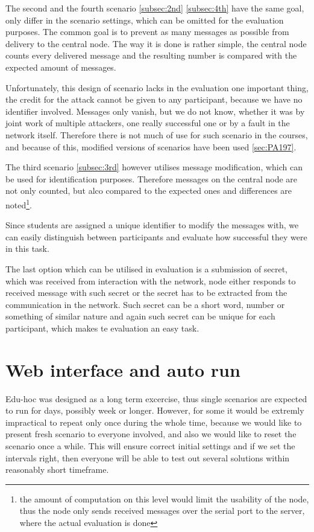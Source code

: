 \documentclass[
  digital, %
  table,   %
  nolof,     %
  nolot,     %
           oneside
]{fithesis3}
\begin{document}
  The second and the fourth scenario \ref{subsec:2nd} \ref{subsec:4th} have the same goal, only differ in the scenario settings, which can be omitted for the evaluation purposes. The common goal is to prevent as many messages as possible from delivery to the central node. The way it is done is rather simple, the central node counts every delivered message and the resulting number is compared with the expected amount of messages.

  Unfortunately, this design of scenario lacks in the evaluation one important thing, the credit for the attack cannot be given to any participant, because we have no identifier involved. Messages only vanish, but we do not know, whether it was by joint work of multiple attackers, one really successful one or by a fault in the network itself. Therefore there is not much of use for such scenario in the courses, and because of this, modified versions of scenarios have been used \ref{sec:PA197}.

  The third scenario \ref{subsec:3rd} however utilises message modification, which can be used for identification purposes. Therefore messages on the central node are not only counted, but alco compared to the expected ones and differences are noted\footnote{the amount of computation on this level would limit the usability of the node, thus the node only sends received messages over the serial port to the server, where the actual evaluation is done}.

  Since students are assigned a unique identifier to modify the messages with, we can easily distinguish between participants and evaluate how successful they were in this task.

  The last option which can be utilised in evaluation is a submission of secret, which was received from interaction with the network, node either responds to received message with such secret or the secret has to be extracted from the communication in the network. Such secret can be a short word, number or something of similar nature and again such secret can be unique for each participant, which makes te evaluation an easy task.
  \section{Web interface and auto run}
  Edu-hoc was designed as a long term excercise, thus single scenarios are expected to run for days, possibly week or longer. However, for some it would be extremly impractical to repeat only once during the whole time, because we would like to present fresh scenario to everyone involved,  and also we would like to reset the scenario once a while. This will ensure correct initial settings and if we set the intervals right, then everyone will be able to test out several solutions within reasonably short timeframe.
\end{document}
